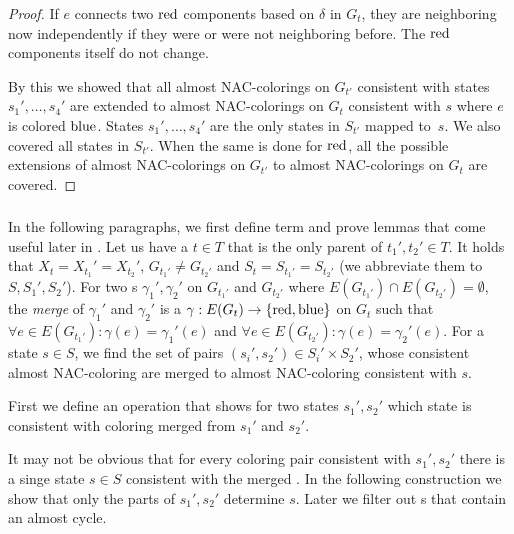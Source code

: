 \begin{proof}
	If \( e \) connects two \( \text{red} \) components based on \( \delta \) in \( G_t \),
	they are neighboring now independently if they were or were not neighboring before.
	The \( \text{red} \) components itself do not change.

	By this we showed that all almost NAC-colorings on \( G_{t'} \) consistent with
	states \( s_1', \dots, s_4' \) are extended to almost NAC-colorings on \( G_t \)
	consistent with \( s \) where \( e \) is colored \( \text{blue} \).
	States \( s_1', \dots, s_4' \) are the only states in \( S_{t'} \) mapped to~\( s \).
	We also covered all states in \( S_{t'} \).
	When the same is done for \( \text{red} \), all the possible extensions
	of almost NAC-colorings on \( G_{t'} \) to almost NAC-colorings on \( G_t \)
	are covered.
\end{proof}

\subsubsection*{\JoinNode{}}

In the following paragraphs,
we first define term and prove lemmas
that come useful later in .
%
Let us have a \JoinNode{} \( t \in T \) that is
the only parent of \( t_1', t_2' \in T \).
It holds that \( X_t = X_{t_1}' = X_{t_2}' \),
\( G_{t_1'} \ne G_{t_2'} \)
and \( S_t = S_{t_1'} = S_{t_2'} \)
(we abbreviate them to \( S, S_1', S_2' \)).
%
For two \rbcol{}s \( \gamma_1', \gamma_2' \)
on \( G_{t_1'} \) and \( G_{t_2'} \)
where \( E(G_{t_1'}) \cap E(G_{t_2'}) = \emptyset \),
the \emph{merge} of \( \gamma_1' \) and \( \gamma_2' \)
is a \rbcol{} \( \gamma : E(G_t) \to \{ \text{red}, \text{blue} \} \) on \( G_t \)
such that \( \forall e \in E(G_{t_1'}) : \gamma(e) = \gamma_1'(e) \) and
\( \forall e \in E(G_{t_2'}) : \gamma(e) = \gamma_2'(e) \).
%
For a state \( s \in S \), we find the set of
pairs \( (s_i', s_2') \in S_i' \times S_2' \),
whose consistent almost NAC-coloring are merged
to almost NAC-coloring consistent with \( s \).

First we define an operation that shows for two states \( s_1', s_2' \)
which state is consistent with coloring merged from \( s_1' \) and \( s_2' \).
%
%
It may not be obvious that for every coloring pair consistent with \( s_1', s_2' \)
there is a singe state \( s \in S \) consistent with the merged \rbcol{}.
In the following construction we show that
only the parts of \( s_1', s_2' \) determine \( s \).
Later we filter out \rbcol{}s that contain an almost cycle.

